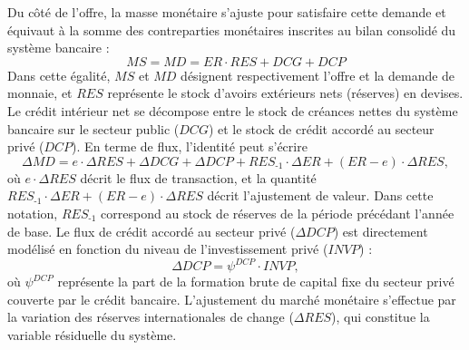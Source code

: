 \documentclass[11pt,a4paper]{article}
\newcommand{\DCG}{\mathit{DCG}}
\newcommand{\RES}{\mathit{RES}}
\newcommand{\MS}{\mathit{MS}}
\newcommand{\MD}{\mathit{MD}}
\newcommand{\DCP}{\mathit{DCP}}
\newcommand{\INVP}{\mathit{INVP}}
\newcommand{\ER}{\mathit{ER}}
\begin{document}
	Du côté de l'offre, la masse monétaire s'ajuste pour satisfaire cette demande et équivaut à la somme des contreparties monétaires inscrites au bilan consolidé du système bancaire :
	\begin{equation*}
		\MS = \MD = \ER \cdot \RES + \DCG + \DCP
	\end{equation*}
	Dans cette égalité, $\MS$ et $\MD$ désignent respectivement l'offre et la demande de monnaie, et $\RES$ représente le stock d'avoirs extérieurs nets (réserves) en devises. Le crédit intérieur net se décompose entre le stock de créances nettes du système bancaire sur le secteur public ($\DCG$) et le stock de crédit accordé au secteur privé ($\DCP$). 
	En terme de flux, l'identité peut s'écrire
	\begin{equation*}
		\Delta \MD = e\cdot\Delta\RES + \Delta\DCG + \Delta \DCP + \RES_{\textit{-1}}\cdot\Delta\ER + (\ER - e)\cdot\Delta\RES,
	\end{equation*}
	où $e\cdot\Delta\RES$ décrit le flux de transaction, et la quantité $\RES_{\textit{-1}}\cdot\Delta\ER + (\ER - e)\cdot\Delta\RES$ décrit l'ajustement de valeur. Dans cette notation, $\RES_{\textit{-1}}$ correspond au stock de réserves de la période précédant l'année de base.
	Le flux de crédit accordé au secteur privé ($\Delta\DCP$) est directement modélisé en fonction du niveau de l'investissement privé ($\INVP$) :
	\begin{equation*}
		\Delta\DCP = \psi^{\DCP} \cdot \INVP,
	\end{equation*}
	où $\psi^{\DCP}$ représente la part de la formation brute de capital fixe du secteur privé couverte par le crédit bancaire. L'ajustement du marché monétaire s'effectue par la variation des réserves internationales de change ($\Delta\RES$), qui constitue la variable résiduelle du système.
	
\end{document}
